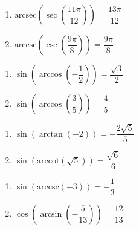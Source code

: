 \documentclass{ximera}
\begin{document}
\begin{multicols}{2}

\begin{enumerate}

\setcounter{enumi}{\value{HW}}

\item  $\text{arcsec}\left(\sec\left(\dfrac{11\pi}{12}\right) \right) = \dfrac{13\pi}{12}$
\item  $\text{arccsc}\left(\csc\left(\dfrac{9\pi}{8}\right) \right) = \dfrac{9\pi}{8}$ 

\setcounter{HW}{\value{enumi}}

\end{enumerate}

\end{multicols}


\begin{multicols}{2}

\begin{enumerate}

\setcounter{enumi}{\value{HW}}

\item  $\sin\left(\arccos\left(-\dfrac{1}{2}\right)\right) = \dfrac{\sqrt{3}}{2}$
\item  $\sin\left(\arccos\left(\dfrac{3}{5}\right)\right) = \dfrac{4}{5}$

\setcounter{HW}{\value{enumi}}

\end{enumerate}

\end{multicols}

\begin{multicols}{2}

\begin{enumerate}

\setcounter{enumi}{\value{HW}}

\item  $\sin\left(\arctan\left(-2\right)\right) = -\dfrac{2\sqrt{5}}{5}$
\item  $\sin\left(\text{arccot}\left(\sqrt{5}\right)\right) = \dfrac{\sqrt{6}}{6}$

\setcounter{HW}{\value{enumi}}

\end{enumerate}

\end{multicols}

\begin{multicols}{2}

\begin{enumerate}

\setcounter{enumi}{\value{HW}}

\item  $\sin\left(\text{arccsc}\left(-3\right)\right) = -\dfrac{1}{3}$ 
\item  $\cos\left(\arcsin\left(-\dfrac{5}{13}\right)\right) = \dfrac{12}{13}$

\setcounter{HW}{\value{enumi}}

\end{enumerate}

\end{multicols}
\end{document}
